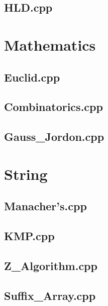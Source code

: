 \subsection{HLD.cpp}

\section{Mathematics}
\subsection{Euclid.cpp}

\subsection{Combinatorics.cpp}

\subsection{Gauss\_Jordon.cpp}

\section{String}
\subsection{Manacher's.cpp}

\subsection{KMP.cpp}

\subsection{Z\_Algorithm.cpp}

\subsection{Suffix\_Array.cpp}

